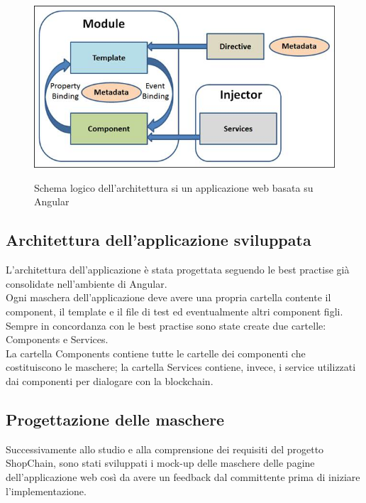 \begin{figure}[!h] 
    \centering 
    \includegraphics[width=0.8\columnwidth]{immagini/AngularArchitecture.jpg} 
    \caption{Schema logico dell'architettura si un applicazione web basata su Angular}\cite{site:angular-architecture}
\end{figure}

\subsection{Architettura dell'applicazione sviluppata}
L’architettura dell’applicazione è stata progettata seguendo le best practise già consolidate nell’ambiente di Angular.\\
Ogni maschera dell’applicazione deve avere una propria cartella contente il component, il template e il file di test ed eventualmente altri component figli.\\
Sempre in concordanza con le best practise sono state create due cartelle: Components e Services.\\
La cartella Components contiene tutte le cartelle dei componenti che costituiscono le maschere; la cartella Services contiene, invece, i service utilizzati dai componenti per dialogare con la blockchain.


\subsection{Progettazione delle maschere}

Successivamente allo studio e alla comprensione dei requisiti del progetto ShopChain, sono stati sviluppati i mock-up delle maschere delle pagine dell'applicazione web così da avere un feedback dal committente prima di iniziare l'implementazione.

